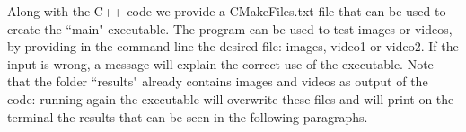 Along with the C++ code we provide a CMakeFiles.txt file that can be used to create the “main" executable. 
The program can be used to test images or videos, by providing in the command line the desired file: images, video1 or video2. If the input is wrong, a message will explain the correct use of the executable.
Note that the folder “results" already contains images and videos as output of the code: running again the executable will overwrite these files and will print on the terminal the results that can be seen in the following paragraphs.

